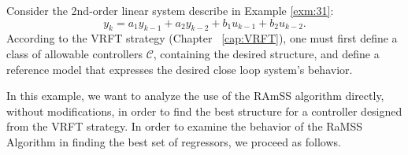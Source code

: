 



\begin{exmp}\label{ex:sis2aord}

  Consider the 2nd-order linear system describe in Example \ref{exm:31}: 
  \begin{equation}
    \label{eq:sis2aord}
    y_k = a_1y_{k-1} + a_2y_{k-2} + b_1u_{k-1} + b_2u_{k-2}.
  \end{equation}
  According to the VRFT strategy (Chapter ~\ref{cap:VRFT}), one must first define a class of allowable controllers $\mathscr{C}$, containing the desired  structure, and define a reference model that expresses the desired close loop system's behavior.

  In this example, we want to analyze the use of the RAmSS algorithm directly, without modifications, in order to find the best structure for a controller designed from the VRFT strategy.
  In order to examine the behavior of the RaMSS Algorithm in finding the best set of regressors, we proceed as follows.


\end{exmp}
